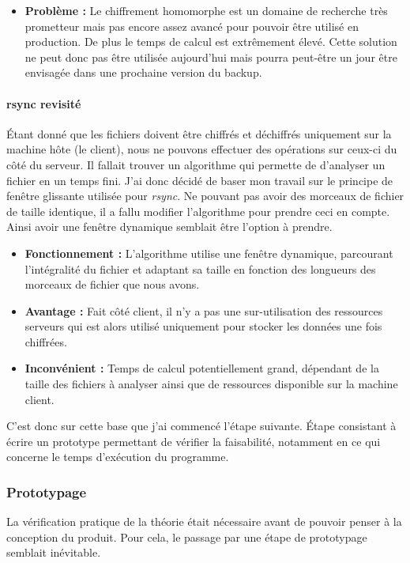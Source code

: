 \documentclass[a4paper,10pt, twoside]{report}
\begin{document}
\begin{spacing}{1.2}
\begin{itemize}
 \item \textbf{Probl\`eme :} Le chiffrement homomorphe est un domaine de
 recherche tr\`es prometteur mais pas encore assez avanc\'e pour pouvoir
 \^etre utilis\'e en production. De plus le temps de calcul est extr\^emement
 \'elev\'e. Cette solution ne peut donc pas \^etre utilis\'ee aujourd'hui mais
 pourra peut-\^etre un jour \^etre envisag\'ee dans une prochaine version du
backup.
\end{itemize}

\paragraph{rsync revisit\'e}
\'Etant donn\'e que les fichiers doivent \^etre chiffr\'es et d\'echiffr\'es
uniquement sur la machine h\^ote (le client), nous ne pouvons effectuer des
op\'erations sur ceux-ci du c\^ot\'e du serveur. Il fallait trouver un
algorithme qui permette de d'analyser un fichier en un temps fini. J'ai donc
d\'ecid\'e de baser mon travail sur le principe de fen\^etre glissante
utilis\'ee pour \textit{rsync}. Ne pouvant pas avoir des morceaux de fichier de
taille identique, il a fallu modifier l'algorithme pour prendre ceci en compte.
Ainsi avoir une fen\^etre dynamique semblait \^etre l'option \`a prendre.

\begin{itemize}
 \item \textbf{Fonctionnement :} L'algorithme utilise une fen\^etre dynamique,
 parcourant l'int\'egralit\'e du fichier et adaptant sa taille en fonction
 des longueurs des morceaux de fichier que nous avons.
 
 \item \textbf{Avantage :} Fait c\^ot\'e client, il n'y a pas une
 sur-utilisation des ressources serveurs qui est alors utilis\'e uniquement
 pour stocker les donn\'ees une fois chiffr\'ees.
 
 \item \textbf{Inconv\'enient :} Temps de calcul potentiellement grand,
 d\'ependant de la taille des fichiers \`a analyser ainsi que de ressources
 disponible sur la machine client.
\end{itemize}

C'est donc sur cette base que j'ai commenc\'e l'\'etape suivante. \'Etape 
consistant \`a \'ecrire un prototype permettant de v\'erifier la faisabilit\'e,
notamment en ce qui concerne le temps d'ex\'ecution du programme.

\subsubsection{Prototypage}
La v\'erification pratique de la th\'eorie \'etait n\'ecessaire avant de
pouvoir penser \`a la conception du produit. Pour cela, le passage par une
\'etape de prototypage semblait in\'evitable.


\end{spacing}
\end{document}
